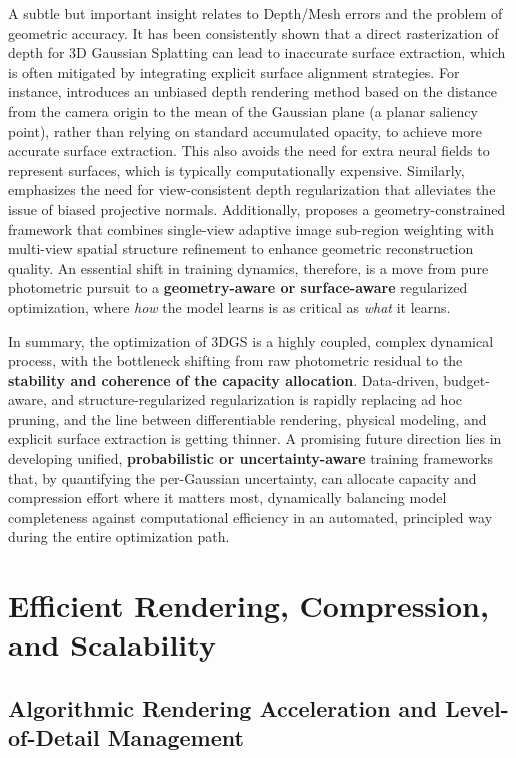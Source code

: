 \documentclass[11pt,a4paper]{article}
\begin{document}
A subtle but important insight relates to Depth/Mesh errors and the problem of geometric accuracy. It has been consistently shown that a direct rasterization of depth for 3D Gaussian Splatting can lead to inaccurate surface extraction, which is often mitigated by integrating explicit surface alignment strategies. For instance, \cite{arxiv:2406.06521v1} introduces an unbiased depth rendering method based on the distance from the camera origin to the mean of the Gaussian plane (a planar saliency point), rather than relying on standard accumulated opacity, to achieve more accurate surface extraction. This also avoids the need for extra neural fields to represent surfaces, which is typically computationally expensive. Similarly, \cite{arxiv:2508.07701v2} emphasizes the need for view-consistent depth regularization that alleviates the issue of biased projective normals. Additionally, \cite{arxiv:1501.01548v2} proposes a geometry-constrained framework that combines single-view adaptive image sub-region weighting with multi-view spatial structure refinement to enhance geometric reconstruction quality. An essential shift in training dynamics, therefore, is a move from pure photometric pursuit to a \textbf{geometry-aware or surface-aware} regularized optimization, where \emph{how} the model learns is as critical as \emph{what} it learns.

In summary, the optimization of 3DGS is a highly coupled, complex dynamical process, with the bottleneck shifting from raw photometric residual to the \textbf{stability and coherence of the capacity allocation}. Data-driven, budget-aware, and structure-regularized regularization is rapidly replacing ad hoc pruning, and the line between differentiable rendering, physical modeling, and explicit surface extraction is getting thinner. A promising future direction lies in developing unified, \textbf{probabilistic or uncertainty-aware} training frameworks that, by quantifying the per-Gaussian uncertainty, can allocate capacity and compression effort where it matters most, dynamically balancing model completeness against computational efficiency in an automated, principled way during the entire optimization path.


\section{Efficient Rendering, Compression, and Scalability}



\subsection{Algorithmic Rendering Acceleration and Level-of-Detail Management}
\end{document}
